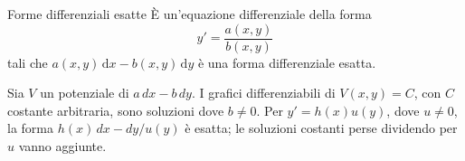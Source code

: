 \documentclass[a4paper]{article}
\begin{document}
\begin{radioactive}
\begin{snippetdefinition}{Forme differenziali esatte}
    È un'equazione differenziale della forma
    \[
        y' = \frac{a(x,y)}{b(x,y)}
    \]
    tali che \(a(x,y)\,\text{d}x - b(x,y)\,\text{d}y\) è una forma differenziale esatta.
\end{snippetdefinition}
\end{radioactive}

\begin{radioactive}
Sia \(V\) un potenziale di \(a\,dx-b\,dy\). I grafici differenziabili
di \(V(x,y)=C\), con \(C\) costante arbitraria, sono soluzioni dove \(b\neq0\).
Per \(y'=h(x)u(y)\), dove \(u\neq0\), la forma \(h(x)\,dx-dy/u(y)\)
è esatta; le soluzioni costanti perse dividendo per \(u\) vanno aggiunte.
\end{radioactive}

\pagebreak
\end{document}
